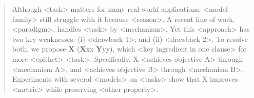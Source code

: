 \begin{abstract}
Although <task> matters for many real-world applications, <model family> still struggle with it because <reason>.
A recent line of work, <paradigm>, handles <task> by <mechanism>.
Yet this <approach> has two key weaknesses: (i) <drawback 1>; and (ii) <drawback 2>.
To resolve both, we propose \textbf{X} (\textbf{X}xx \textbf{Y}yy), which <key ingredient in one clause> for more <epithet> <task>.
Specifically, X <achieves objective A> through <mechanism A>, and <achieves objective B> through <mechanism B>.
Experiments with several <models> on <tasks> show that X improves <metric> while preserving <other property>.
\end{abstract}
